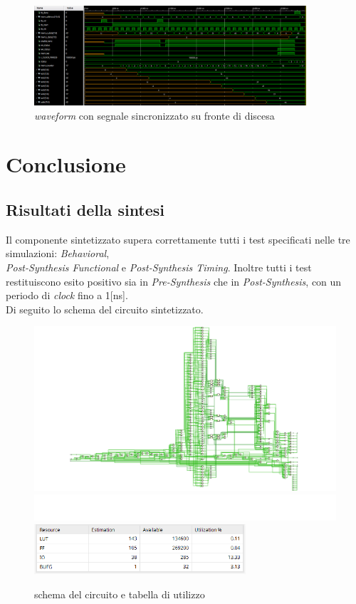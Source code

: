 \documentclass{article}
\begin{document}
\begin{enumerate}
\begin{figure}[h]
    \includegraphics[width=0.9\textwidth]{rst_while_start_f0}
    \caption{\textit{waveform} con segnale sincronizzato su fronte di discesa}
\end{figure}
\end{enumerate}
\pagebreak
\section{Conclusione}
\subsection{Risultati della sintesi}
Il componente sintetizzato supera correttamente tutti i test specificati nelle tre simulazioni: \textit{Behavioral}, \\\textit{Post-Synthesis Functional} e \textit{Post-Synthesis Timing}. Inoltre tutti i test restituiscono esito positivo sia in \textit{Pre-Synthesis} che in \textit{Post-Synthesis}, con un periodo di \textit{clock} fino a 1[ns].\\ Di seguito lo schema del circuito sintetizzato.
\begin{figure}[h]
    \centering
    \includegraphics[width=1\textwidth]{schema}
    \includegraphics[width=1\textwidth]{spazio}
    \includegraphics[width=0.7\textwidth]{utilizzo}
    \caption{schema del circuito e tabella di utilizzo}
\end{figure}
\end{document}
